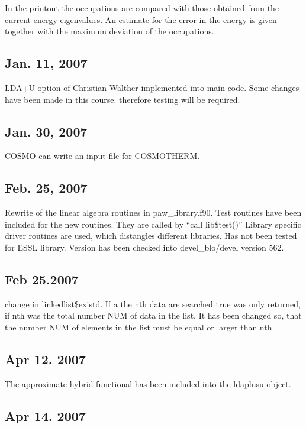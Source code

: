 \documentclass[final,12pt]{article}
\begin{document}
In the printout the occupations are compared with those obtained from the
current energy eigenvalues. An estimate for the error in the energy is given
together with the maximum deviation of the occupations. 

\subsection{Jan. 11, 2007}

LDA+U option of Christian Walther implemented into main code. Some changes
have been made in this course. therefore testing will be required.

\subsection{Jan. 30, 2007}

COSMO can write an input file for COSMOTHERM.

\subsection{Feb. 25, 2007}

Rewrite of the linear algebra routines in paw_library.f90. Test routines have been 
included for the new routines. They are called by ``call lib\$test()''
Library specific driver routines are used, which distangles different libraries.
Has not been tested for ESSL library. Version has been checked into 
devel_blo/devel version 562.

\subsection{Feb 25.2007}

change in linkedlist\$existd. If a the nth data are searched true was
only returned, if nth was the total number NUM of data in the list. It has
been changed so, that the number NUM of elements in the list must be equal
or larger than nth.

\subsection{Apr 12. 2007}

The approximate hybrid functional has been included into the ldaplusu object.

\subsection{Apr 14. 2007}
\end{document}
